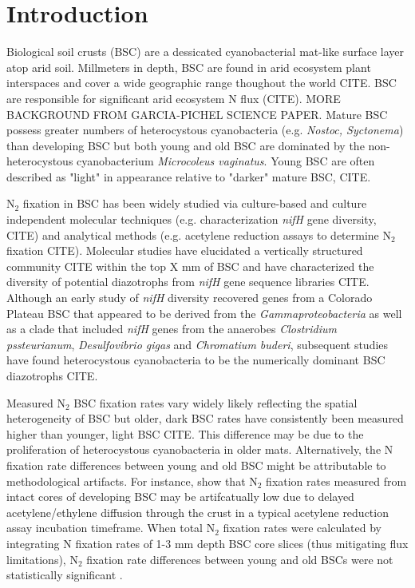 \section{Introduction}


Biological soil crusts (BSC) are a dessicated cyanobacterial mat-like surface layer atop arid soil. Millmeters in depth, BSC are found in arid ecosystem plant interspaces and cover a wide geographic range thoughout the world CITE. BSC are responsible for significant arid ecosystem N flux (CITE). MORE BACKGROUND FROM GARCIA-PICHEL SCIENCE PAPER. Mature BSC possess greater numbers of heterocystous cyanobacteria (e.g. \textit{Nostoc, Syctonema}) than developing BSC but both young and old BSC are dominated by the non-heterocystous cyanobacterium \textit{Microcoleus vaginatus}. Young BSC are often described as "light" in appearance relative to "darker" mature BSC, CITE.

N$_{2}$ fixation in BSC has been widely studied via culture-based and culture independent molecular techniques (e.g. characterization \textit{nifH} gene diversity, CITE) and analytical methods (e.g. acetylene reduction assays to determine N$_{2}$ fixation CITE). Molecular studies have elucidated a vertically structured community CITE within the top X mm of BSC and have characterized the diversity of potential diazotrophs from \textit{nifH} gene sequence libraries CITE. Although an early study of \textit{nifH} diversity recovered genes from a Colorado Plateau BSC that appeared to be derived from the \textit{Gammaproteobacteria} as well as a clade that included \textit{nifH} genes from the anaerobes \textit{Clostridium pssteurianum}, \textit{Desulfovibrio gigas} and \textit{Chromatium buderi}, subsequent studies have found heterocystous cyanobacteria to be the numerically dominant BSC diazotrophs CITE. 

Measured N$_{2}$ BSC fixation rates vary widely likely reflecting the spatial heterogeneity of BSC but older, dark BSC rates have consistently been measured higher than younger, light BSC CITE. This difference may be due to the proliferation of heterocystous cyanobacteria in older mats. Alternatively, the N fixation rate differences between young and old BSC might be attributable to methodological artifacts. For instance, \citet{15643930} show that N$_{2}$ fixation rates measured from intact cores of developing BSC may be artifcatually low due to delayed acetylene/ethylene diffusion through the crust in a typical acetylene reduction assay incubation timeframe. When total N$_{2}$ fixation rates were calculated by integrating N fixation rates of 1-3 mm depth BSC core slices (thus mitigating flux limitations), N$_{2}$ fixation rate differences between young and old BSCs were not statistically significant \cite{15643930}.


